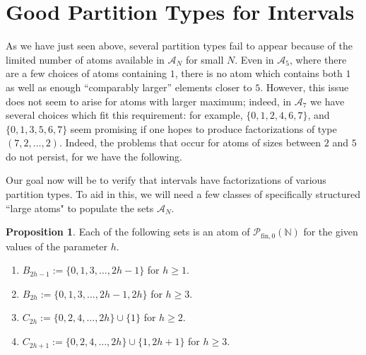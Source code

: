 \documentclass{report}
\newcommand{\NN}{\mathbb{N}}
\renewcommand{\P}{\mathcal{P}}
\newcommand{\fin}{\textrm{fin}}
\renewcommand{\:}{\text{:}}
\newcommand{\PN}{{\P_{\fin,0}(\NN)}}
\theoremstyle{definition}
\newtheorem{prop}[defn]{Proposition}
\begin{document}
\section{Good Partition Types for Intervals}

As we have just seen above, several partition types fail to appear because of the limited number of atoms available in $\mathcal{A}_N$ for small $N$.
Even in $\mathcal{A}_5$, where there are a few choices of atoms containing $1$, there is no atom which contains both $1$ as well as enough ``comparably larger'' elements closer to $5$.
However, this issue does not seem to arise for atoms with larger maximum; indeed, in $\mathcal{A}_7$ we have several choices which fit this requirement: for example, $\{0, 1, 2, 4, 6, 7\}$, and $\{0, 1, 3, 5, 6, 7\}$ seem promising if one hopes to produce factorizations of type $(7,2,\dots, 2)$. 
Indeed, the problems that occur for atoms of sizes between $2$ and $5$ do not persist, for we have the following.

Our goal now will be to verify that intervals have factorizations of various partition types.  
To aid in this, we will need a few classes of specifically structured ``large atoms" to populate the sets $\mathcal{A}_N$.

\begin{prop} \label{prop:2-congruence atoms}
	Each of the following sets is an atom of $\PN$ for the given values of the parameter $h$.
	\begin{enumerate}[label={\rm (\roman{*})}]
		\item $B_{2h-1} := \{0,1,3,\dots, 2h-1\}$ for $h\ge 1$.
		\item $B_{2h} := \{0,1,3,\dots, 2h-1,2h\}$ for $h \ge 3$.
		\item $C_{2h} := \{0,2,4,\dots,2h\}\cup\{1\}$ for $h\ge 2$.
		\item $C_{2h+1} := \{0,2,4,\dots, 2h\}\cup\{1,2h+1\}$ for $h\ge 3$.
	\end{enumerate}
\end{prop}
\end{document}
